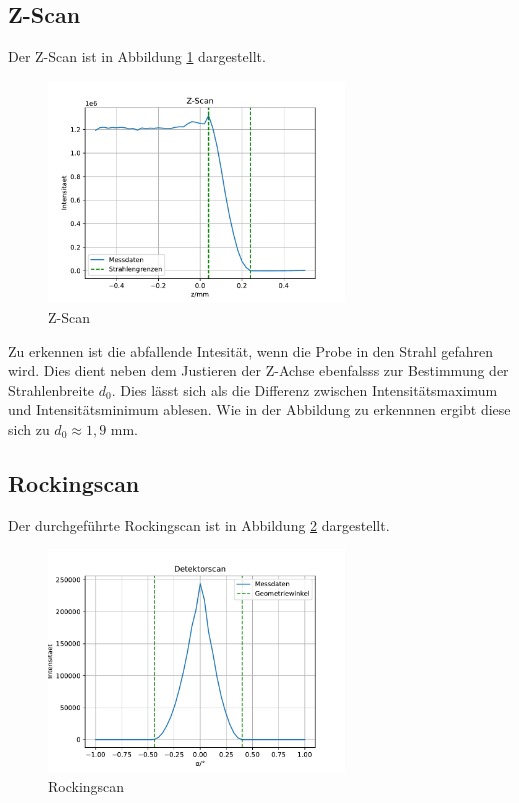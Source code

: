 \subsection{Z-Scan}
Der Z-Scan ist in Abbildung \ref{fig:Z} dargestellt.
\begin{figure}[h]
    \centering
    \includegraphics[width = 0.7\textwidth]{Auswertung/Graphen/z_Scan.pdf}
    \caption{Z-Scan}
    \label{fig:Z}
\end{figure}
Zu erkennen ist die abfallende Intesität, wenn die Probe in den Strahl gefahren wird.
Dies dient neben dem Justieren der Z-Achse ebenfalsss zur Bestimmung der Strahlenbreite $d_0$.
Dies lässt sich als die Differenz zwischen Intensitätsmaximum und Intensitätsminimum ablesen.
Wie in der Abbildung zu erkennnen ergibt diese sich zu $d_0 \approx 1,9$ mm.



\subsection{Rockingscan}
Der durchgeführte Rockingscan ist in Abbildung \ref{fig:roc} dargestellt.
\begin{figure}[h]
    \centering
    \includegraphics[width = 0.7\textwidth]{Auswertung/Graphen/Rocking_Scan.pdf}
    \caption{Rockingscan}
    \label{fig:roc}
\end{figure}

